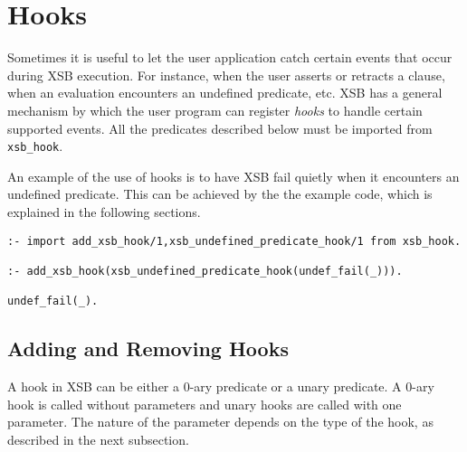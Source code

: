 \chapter{Hooks} \label{hooks}

Sometimes it is useful to let the user application catch certain
events that occur during XSB execution. For instance, when the user
asserts or retracts a clause, when an evaluation encounters an
undefined predicate, etc.  XSB has a general mechanism by which the
user program can register \emph{hooks} to handle certain supported
events. All the predicates described below must be imported from {\tt
xsb\_hook}.

An example of the use of hooks is to have XSB fail quietly when it
encounters an undefined predicate.  This can be achieved by the
the example code, which is explained in the following sections.

\begin{verbatim}
:- import add_xsb_hook/1,xsb_undefined_predicate_hook/1 from xsb_hook.

:- add_xsb_hook(xsb_undefined_predicate_hook(undef_fail(_))).

undef_fail(_).
\end{verbatim}


\section{Adding and Removing Hooks}

A hook in XSB can be either a 0-ary predicate or a unary predicate.
A 0-ary hook is called without parameters and unary hooks are called with
one parameter. The nature of the parameter depends on the type of the hook,
as described in the next subsection.


